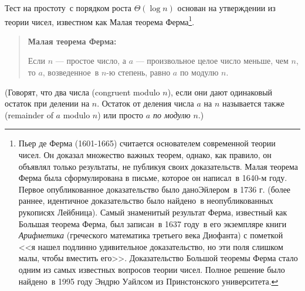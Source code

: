 Тест на
простоту~с порядком роста $\Theta(\log n)$ основан на утверждении из
теории чисел, известном как Малая
теорема Ферма\footnote{Пьер де Ферма (1601-1665) 
  считается основателем
  современной теории чисел.  Он доказал множество важных теорем, однако,
  как правило, он объявлял только результаты, не
  публикуя своих доказательств.  Малая теорема Ферма была сформулирована 
 в письме, которое он написал~в 1640-м году.  Первое опубликованное
  доказательство было даноЭйлером~в 1736 г. (более раннее,
  идентичное
  доказательство было найдено~в неопубликованных рукописях
  Лейбница).
  Самый знаменитый результат Ферма, известный как Большая теорема
  Ферма, был записан~в 1637 году~в его экземпляре книги
   {\em
    Арифметика} (греческого математика третьего века  Диофанта) с
  пометкой <<я нашел подлинно удивительное
  доказательство, но эти поля слишком малы, чтобы вместить его>>.
  Доказательство Большой теоремы Ферма стало одним из самых известных
  вопросов теории чисел.  Полное решение было найдено~в 1995 году
  Эндрю Уайлсом 
  из Принстонского университета.}.

\begin{quote}
{\bf Малая теорема Ферма:}

Если $n$ --- простое число, а
$a$ --- произвольное целое число меньше, чем $n$, то 
$a$, возведенное~в $n$-ю степень, равно
$a$ по модулю $n$.
\end{quote}
(Говорят, что два числа  (congruent modulo $n$), если они дают одинаковый остаток при
делении на $n$.  Остаток от деления числа $a$ на 
$n$ называется также 
 (remainder of $a$ modulo $n$) или
просто {\em $a$ по модулю $n$}.)

